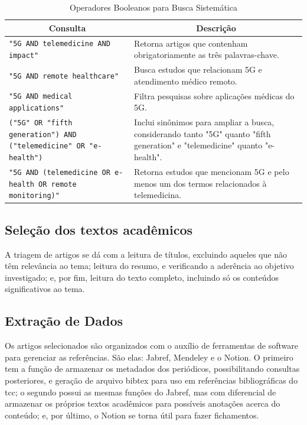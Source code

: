 \begin{table}[h!] 
    \centering
    \renewcommand{\arraystretch}{1.5}
    \caption{Operadores Booleanos para Busca Sistemática}
    \label{tab:operadores_booleanos}
    \begin{tabular}{p{6cm} p{9cm}}
        \hline
        \multicolumn{1}{c}{\textbf{Consulta}} & \multicolumn{1}{c}{\textbf{Descrição}} \\
        \hline
        \texttt{"5G AND telemedicine AND impact"} & Retorna artigos que contenham obrigatoriamente as três palavras-chave. \\
        \texttt{"5G AND remote healthcare"} & Busca estudos que relacionam 5G e atendimento médico remoto. \\
        \texttt{"5G AND medical applications"} & Filtra pesquisas sobre aplicações médicas do 5G. \\
        \texttt{("5G" OR "fifth generation") AND ("telemedicine" OR "e-health")} & Inclui sinônimos para ampliar a busca, considerando tanto "5G" quanto "fifth generation" e "telemedicine" quanto "e-health". \\
        \texttt{"5G AND (telemedicine OR e-health OR remote monitoring)"} & Retorna estudos que mencionam 5G e pelo menos um dos termos relacionados à telemedicina. \\
        \hline
    \end{tabular}
\end{table}

\break

\subsection{Seleção dos textos acadêmicos}

A triagem de artigos se dá com a leitura de títulos, excluindo aqueles que não têm relevância ao tema; leitura do resumo, e verificando a aderência ao objetivo investigado; e, por fim, leitura do texto completo, incluindo só os conteúdos significativos ao tema.

\subsection{Extração de Dados}

Os artigos selecionados são organizados com o auxílio de ferramentas de software para gerenciar as referências. São elas: Jabref, Mendeley e o Notion. O primeiro tem a função de armazenar os metadados dos periódicos, possibilitando consultas posteriores, e geração de arquivo bibtex para uso em referências bibliográficas do \gls{tcc}; o segundo possui as mesmas funções do Jabref, mas com diferencial de armazenar os próprios textos acadêmicos para possíveis anotações acerca do conteúdo; e, por último, o Notion se torna útil para fazer fichamentos.

